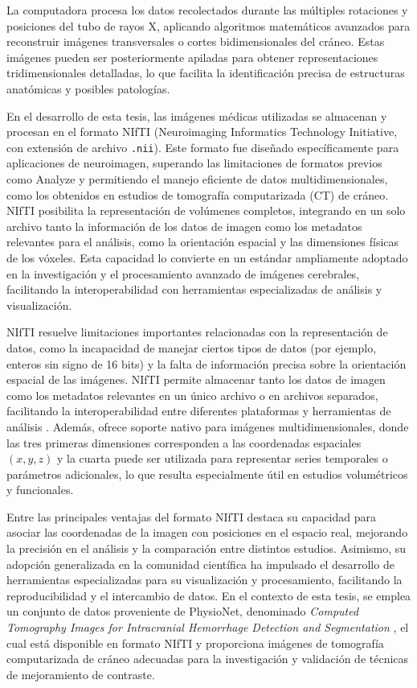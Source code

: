 La computadora procesa los datos recolectados durante las múltiples rotaciones y posiciones del tubo de rayos X, aplicando algoritmos matemáticos avanzados para reconstruir imágenes transversales o cortes bidimensionales del cráneo. Estas imágenes pueden ser posteriormente apiladas para obtener representaciones tridimensionales detalladas, lo que facilita la identificación precisa de estructuras anatómicas y posibles patologías.%

En el desarrollo de esta tesis, las imágenes médicas utilizadas se almacenan y procesan en el formato NIfTI (Neuroimaging Informatics Technology Initiative, con extensión de archivo \texttt{.nii}). Este formato fue diseñado específicamente para aplicaciones de neuroimagen, superando las limitaciones de formatos previos como Analyze y permitiendo el manejo eficiente de datos multidimensionales, como los obtenidos en estudios de tomografía computarizada (CT) de cráneo. NIfTI posibilita la representación de volúmenes completos, integrando en un solo archivo tanto la información de los datos de imagen como los metadatos relevantes para el análisis, como la orientación espacial y las dimensiones físicas de los vóxeles. Esta capacidad lo convierte en un estándar ampliamente adoptado en la investigación y el procesamiento avanzado de imágenes cerebrales, facilitando la interoperabilidad con herramientas especializadas de análisis y visualización.%

NIfTI resuelve limitaciones importantes relacionadas con la representación de datos, como la incapacidad de manejar ciertos tipos de datos (por ejemplo, enteros sin signo de 16 bits) y la falta de información precisa sobre la orientación espacial de las imágenes. NIfTI permite almacenar tanto los datos de imagen como los metadatos relevantes en un único archivo o en archivos separados, facilitando la interoperabilidad entre diferentes plataformas y herramientas de análisis . Además, ofrece soporte nativo para imágenes multidimensionales, donde las tres primeras dimensiones corresponden a las coordenadas espaciales $ (x, y, z) $ y la cuarta puede ser utilizada para representar series temporales o parámetros adicionales, lo que resulta especialmente útil en estudios volumétricos y funcionales.

Entre las principales ventajas del formato NIfTI destaca su capacidad para asociar las coordenadas de la imagen con posiciones en el espacio real, mejorando la precisión en el análisis y la comparación entre distintos estudios. Asimismo, su adopción generalizada en la comunidad científica ha impulsado el desarrollo de herramientas especializadas para su visualización y procesamiento, facilitando la reproducibilidad y el intercambio de datos. En el contexto de esta tesis, se emplea un conjunto de datos proveniente de PhysioNet, denominado \emph{Computed Tomography Images for Intracranial Hemorrhage Detection and Segmentation} \cite{DatasetPhysionet,DatasetOriginalArticle}, el cual está disponible en formato NIfTI y proporciona imágenes de tomografía computarizada de cráneo adecuadas para la investigación y validación de técnicas de mejoramiento de contraste.

